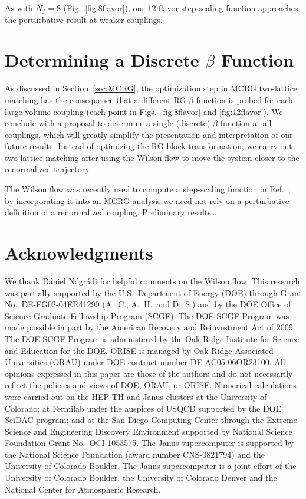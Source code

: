 \documentclass{PoS}
\newcommand{\refcite}[1]{Ref.~\cite{#1}}
\newcommand{\fig}[1]{Fig.~\ref{#1}}
\newcommand{\secref}[1]{Section~\ref{#1}}
\begin{document}
As with $N_f = 8$ (\fig{fig:8flavor}), our 12-flavor step-scaling function approaches the perturbative result at weaker couplings.

\section{Determining a Discrete $\beta$ Function}
As discussed in \secref{sec:MCRG}, the optimization step in MCRG two-lattice matching has the consequence that a different RG $\beta$ function is probed for each large-volume coupling (each point in Figs.~\ref{fig:8flavor} and \ref{fig:12flavor}).
We conclude with a proposal to determine a single (discrete) $\beta$ function at all couplings, which will greatly simplify the presentation and interpretation of our future results.
Instead of optimizing the RG block transformation, we carry out two-lattice matching after using the Wilson flow to move the system closer to the renormalized trajectory.

The Wilson flow was recently used to compute a step-scaling function in \refcite{Fodor:2012td}; by incorporating it into an MCRG analysis we need not rely on a perturbative definition of a renormalized coupling.
Preliminary results\dots

\section*{Acknowledgments}
We thank D\'aniel N\'ogr\'adi for helpful comments on the Wilson flow.
This research was partially supported by the U.S.~Department of Energy (DOE) through Grant No.~DE-FG02-04ER41290 (A.~C., A.~H.\ and D.~S.) and by the DOE Office of Science Graduate Fellowship Program (SCGF).
The DOE SCGF Program was made possible in part by the American Recovery and Reinvestment Act of 2009.
The DOE SCGF Program is administered by the Oak Ridge Institute for Science and Education for the DOE.
ORISE is managed by Oak Ridge Associated Universities (ORAU) under DOE contract number DE-AC05-06OR23100.
All opinions expressed in this paper are those of the authors and do not necessarily reflect the policies and views of DOE, ORAU, or ORISE.
Numerical calculations were carried out on the HEP-TH and Janus clusters at the University of Colorado; at Fermilab under the auspices of USQCD supported by the DOE SciDAC program; and at the San Diego Computing Center through the Extreme Science and Engineering Discovery Environment supported by National Science Foundation Grant No.~OCI-1053575.
The Janus supercomputer is supported by the National Science Foundation (award number CNS-0821794) and the University of Colorado Boulder.
The Janus supercomputer is a joint effort of the University of Colorado Boulder, the University of Colorado Denver and the National Center for Atmospheric Research.



\end{document}
